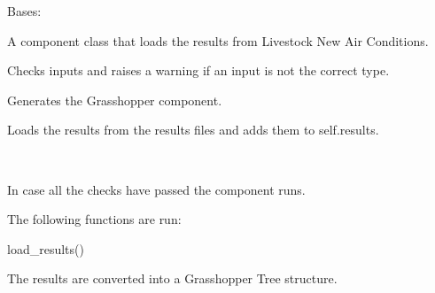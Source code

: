 \documentclass[letterpaper,10pt,english]{sphinxmanual}
\begin{document}
\begin{fulllineitems}
\label{\detokenize{comfort:livestock.components.air.LoadAirResult}}
Bases: {\hyperref[\detokenize{superclass:livestock.components.component.GHComponent}]{}}

A component class that loads the results from Livestock New Air Conditions.

\begin{fulllineitems}
\label{\detokenize{comfort:livestock.components.air.LoadAirResult.check_inputs}}
Checks inputs and raises a warning if an input is not the correct type.

\end{fulllineitems}


\begin{fulllineitems}
\label{\detokenize{comfort:livestock.components.air.LoadAirResult.config}}
Generates the Grasshopper component.

\end{fulllineitems}


\begin{fulllineitems}
\label{\detokenize{comfort:livestock.components.air.LoadAirResult.load_result}}
Loads the results from the results files and adds them to self.results.

\end{fulllineitems}


\begin{fulllineitems}
\label{\detokenize{comfort:livestock.components.air.LoadAirResult.run}}~
\begin{DUlineblock}{0em}
\item[] In case all the checks have passed the component runs.
\item[] The following functions are run:
\item[] load\_results()
\item[] The results are converted into a Grasshopper Tree structure.
\end{DUlineblock}


\end{fulllineitems}
\end{fulllineitems}
\end{document}
